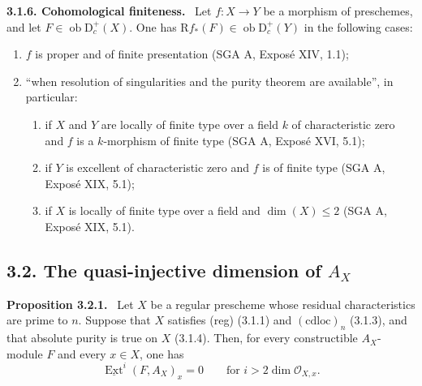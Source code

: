 \documentclass[11pt]{article}
\providecommand{\cO}{\mathcal{O}}
\providecommand{\uExt}{\underline{\Ext}}
\newenvironment{statement}[1]{\par\medskip\noindent\textbf{#1.}\ }{\par\medskip}
\DeclareMathOperator{\Ext}{Ext}
\newcommand{\R}{\mathrm{R}}
\newcommand{\D}{\mathrm{D}}
\newcommand{\ob}{\operatorname{ob}}
\begin{document}
\begin{statement}{3.1.6. Cohomological finiteness}
Let $f:X\to Y$ be a morphism of preschemes, and let $F\in\ob\D_c^+(X)$. One has $\R f_*(F)\in\ob\D_c^+(Y)$ in the following cases:
\begin{enumerate}[label=\alph*)]
\item $f$ is proper and of finite presentation (SGA A, Exposé XIV, 1.1);
\item ``when resolution of singularities and the purity theorem are available'', in particular:
\begin{enumerate}[label=(\roman*)]
\item if $X$ and $Y$ are locally of finite type over a field $k$ of characteristic zero and $f$ is a $k$-morphism of finite type (SGA A, Exposé XVI, 5.1);
\item if $Y$ is excellent of characteristic zero and $f$ is of finite type (SGA A, Exposé XIX, 5.1);
\item if $X$ is locally of finite type over a field and $\dim(X)\le2$ (SGA A, Exposé XIX, 5.1).
\end{enumerate}
\end{enumerate}
\end{statement}

\subsection*{3.2. The quasi-injective dimension of $A_X$}

\begin{statement}{Proposition 3.2.1}
Let $X$ be a regular prescheme whose residual characteristics are prime to $n$. Suppose that $X$ satisfies (reg) (3.1.1) and $(\mathrm{cdloc})_n$ (3.1.3), and that absolute purity is true on $X$ (3.1.4). Then, for every constructible $A_X$-module $F$ and every $x\in X$, one has
\[
   \uExt^i(F,A_X)_x=0\qquad\text{for } i>2\dim\cO_{X,x}.\tag{*}
\]
\end{statement}
\end{document}
